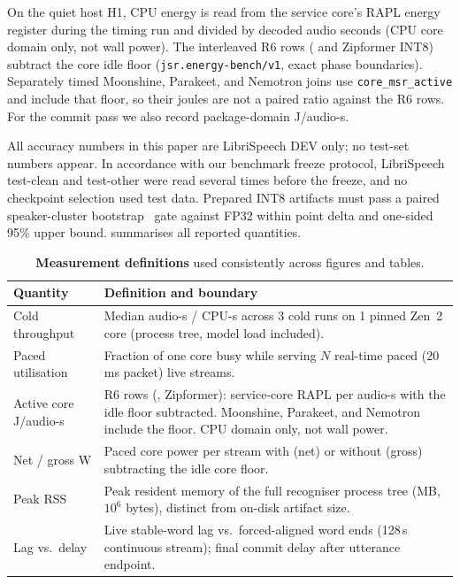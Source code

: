  On the quiet host H1, CPU energy is read from the service core's RAPL energy
register during the timing run and divided by decoded audio seconds (CPU core domain only, not
wall power). The interleaved R6 rows (\ultra{} and Zipformer INT8) subtract the core idle floor
(\texttt{jsr.energy-bench/v1}, exact phase boundaries). Separately timed Moonshine, Parakeet, and
Nemotron joins use \texttt{core\_msr\_active} and include that floor, so their joules are not a
paired ratio against the R6 rows. For the \ultra{} \PriorVer{} commit pass we also record
package-domain J/audio-s.

 All accuracy numbers in this paper are LibriSpeech DEV
only; no test-set numbers appear. In accordance with our benchmark freeze protocol, LibriSpeech
test-clean and test-other were read several times before the freeze, and no checkpoint selection
used test data. Prepared INT8 artifacts must pass a paired speaker-cluster
bootstrap~\cite{bisani2004bootstrap} gate against FP32 within \PreregDeltaPP\pp point delta and
\PreregUpperPP\pp one-sided 95\% upper bound.  summarises all reported quantities.

\begin{table}[t]
\centering
\caption{\textbf{Measurement definitions} used consistently across figures and tables.}
\label{tab:metrics}
\footnotesize
\setlength{\tabcolsep}{3.5pt}
\begin{tabular}{@{}p{2.35cm}p{5.75cm}@{}}
\toprule
Quantity & Definition and boundary \\
\midrule
Cold throughput & Median audio-s / CPU-s across 3 cold runs on 1 pinned Zen~2 core (process tree, model load included). \\
Paced utilisation & Fraction of one core busy while serving $N$ real-time paced (20\,ms packet) live streams. \\
Active core J/audio-s & R6 rows (\ultra{}, Zipformer): service-core RAPL per audio-s with the idle floor subtracted. Moonshine, Parakeet, and Nemotron include the floor. CPU domain only, not wall power. \\
Net / gross W & Paced core power per stream with (net) or without (gross) subtracting the idle core floor. \\
Peak RSS & Peak resident memory of the full recogniser process tree (MB, $10^6$ bytes), distinct from on-disk artifact size. \\
Lag vs.\ delay & Live stable-word lag vs.\ forced-aligned word ends (128\,s continuous stream); final commit delay after utterance endpoint. \\
\bottomrule
\end{tabular}
\end{table}
